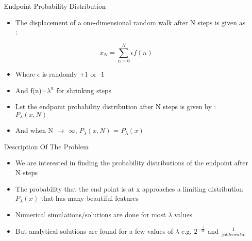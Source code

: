 \documentclass{beamer}
\begin{document}
\begin{frame}{Endpoint Probability Distribution}
	\begin{itemize}
	\setlength\itemsep{1em}
		\item{\large The displacement of a one-dimensional random walk after N steps is given as :}
	\end{itemize}
	\begin{equation}
		x_{N}=\sum_{n=0}^{N}\epsilon f(n)
	\end{equation}
	\begin{itemize}
	\setlength\itemsep{1em}
		\item{Where $\epsilon$ is randomly +1 or -1}
		\item{\large And f(n)=$\lambda^{n}$ for shrinking steps}
		\item{\large Let the endpoint probability distribution after N steps is given by : $P_{\lambda}(x,N)$}
		\item{\large And when N $\rightarrow$ $\infty$, $P_{\lambda}(x,N)$ = $P_{\lambda}(x)$}
	\end{itemize}
\end{frame}

\begin{frame}{Description Of The Problem}
	\begin{itemize}
	\setlength\itemsep{1em}
		\item{\large We are interested in finding the probability distributions of the endpoint after N steps}
		\item{The probability that the end point is at x approaches a limiting distribution $P_{\lambda}(x)$ that has many beautiful features}
		\item{\large Numerical simulations/solutions are done for most $\lambda$ values}
		\item{\large But analytical solutions are found for a few values of $\lambda$ e.g. $2^{-\frac{1}{m}}$ and $\frac{1}{golden ratio}$}
	\end{itemize}
\end{frame}
\end{document}
